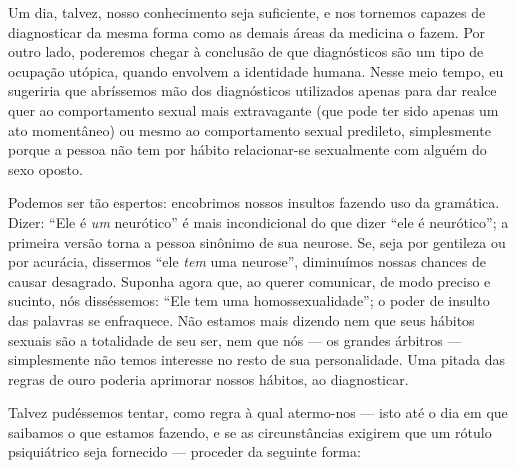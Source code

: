 Um dia, talvez, nosso conhecimento seja suficiente, e nos tornemos
capazes de diagnosticar da mesma forma como as demais áreas da medicina
o fazem. Por outro lado, poderemos chegar à conclusão de que
diagnósticos são um tipo de ocupação utópica, quando envolvem a
identidade humana. Nesse meio tempo, eu sugeriria que abríssemos mão
dos diagnósticos utilizados apenas para dar realce quer ao
comportamento sexual mais extravagante (que pode ter sido apenas um ato
momentâneo) ou mesmo ao comportamento sexual predileto, simplesmente
porque a pessoa não tem por hábito relacionar-se sexualmente com alguém
do sexo oposto.

Podemos ser tão espertos: encobrimos nossos insultos fazendo uso da
gramática. Dizer: ``Ele é \textit{um}
neurótico'' é mais incondicional do que dizer
``ele é neurótico''; a primeira versão torna
a pessoa sinônimo de sua neurose. Se, seja por gentileza ou por
acurácia, dissermos ``ele \textit{tem} uma
neurose'', diminuímos nossas chances de causar desagrado.
Suponha agora que, ao querer comunicar, de modo preciso e sucinto, nós
disséssemos: ``Ele tem uma
homossexualidade''; o poder de insulto das palavras se
enfraquece. Não estamos mais dizendo nem que seus hábitos sexuais são a
totalidade de seu ser, nem que nós --- os grandes árbitros ---
simplesmente não temos interesse no resto de sua personalidade. Uma
pitada das regras de ouro poderia aprimorar nossos hábitos, ao
diagnosticar.

Talvez pudéssemos tentar, como regra à qual atermo-nos --- isto até
o dia em que saibamos o que estamos fazendo, e se as circunstâncias
exigirem que um rótulo\idxdiagrotu{} psiquiátrico seja fornecido --- proceder da
seguinte forma:

